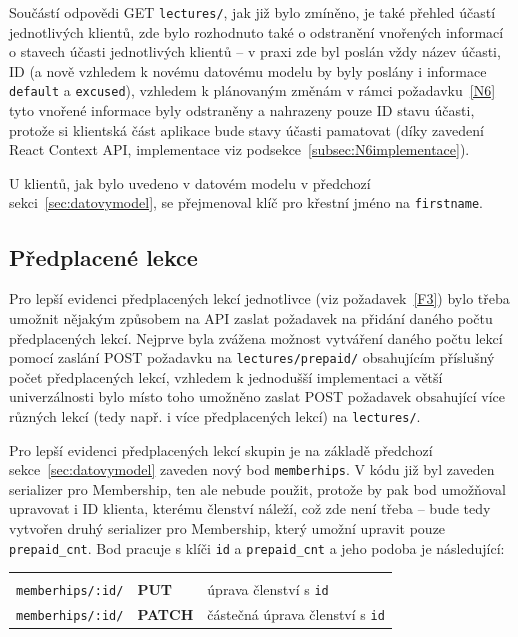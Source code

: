 Součástí odpovědi GET \verb|lectures/|, jak již bylo zmíněno, je také přehled účastí jednotlivých klientů, zde bylo rozhodnuto také o odstranění vnořených informací o stavech účasti jednotlivých klientů -- v praxi zde byl poslán vždy název účasti, ID (a nově vzhledem k novému datovému modelu by byly poslány i informace \verb|default| a \verb|excused|), vzhledem k plánovaným změnám v rámci požadavku~\ref{N6} tyto vnořené informace byly odstraněny a nahrazeny pouze ID stavu účasti, protože si klientská část aplikace bude stavy účasti pamatovat (díky zavedení React Context API, implementace viz podsekce~\ref{subsec:N6implementace}).

U klientů, jak bylo uvedeno v datovém modelu v předchozí sekci~\ref{sec:datovymodel}, se přejmenoval klíč pro křestní jméno na \verb|firstname|.
    
\newcommand{\apiA}{0.33}
\newcommand{\apiB}{0.14}
\newcommand{\apiC}{0.43}

\subsection{Předplacené lekce}

Pro lepší evidenci předplacených lekcí jednotlivce (viz požadavek~\ref{F3}) bylo třeba umožnit nějakým způsobem na API zaslat požadavek na přidání daného počtu předplacených lekcí. Nejprve byla zvážena možnost vytváření daného počtu lekcí pomocí zaslání POST požadavku na \verb|lectures/prepaid/| obsahujícím příslušný počet předplacených lekcí, vzhledem k jednodušší implementaci a větší univerzálnosti bylo místo toho umožněno zaslat POST požadavek obsahující více různých lekcí (tedy např. i více předplacených lekcí) na \verb|lectures/|.

Pro lepší evidenci předplacených lekcí skupin je na základě předchozí sekce~\ref{sec:datovymodel} zaveden nový bod \verb|memberhips|. V kódu již byl zaveden serializer pro Membership, ten ale nebude použit, protože by pak bod umožňoval upravovat i ID klienta, kterému členství náleží, což zde není třeba -- bude tedy vytvořen druhý serializer pro Membership, který umožní upravit pouze \verb|prepaid_cnt|. Bod pracuje s klíči \verb|id| a \verb|prepaid_cnt| a jeho podoba je následující:

{\centering
\begin{tabular}{p{\apiA\textwidth} p{\apiB\textwidth} p{\apiC\textwidth}}&&\\
    \verb|memberhips/:id/|     & \textbf{PUT}      & úprava členství s \verb|id|\\
    \verb|memberhips/:id/|     & \textbf{PATCH}    & částečná úprava členství s \verb|id|\\
\end{tabular}}

